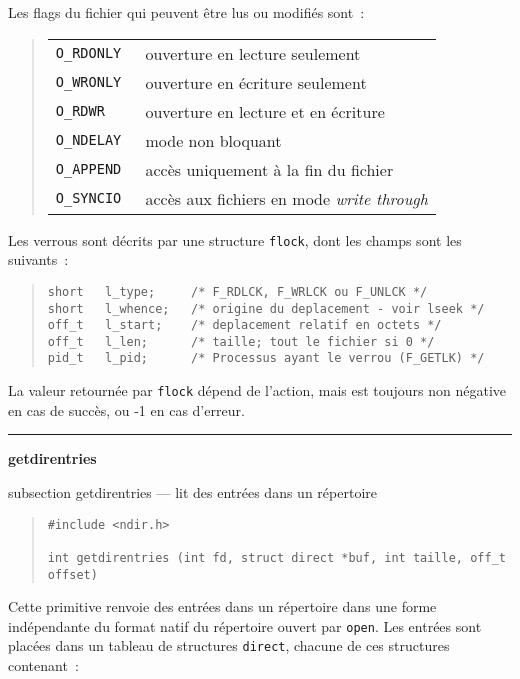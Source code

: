 \documentclass [twoside] {report}
\newcommand {\primitive} [1]
    {
	{\large \bf #1}
	\addcontentsline {toc} {subsection} {#1}
    }
\newcommand {\separation}
    {
	\vspace {7mm}
	\nopagebreak
	\hrule
    }
\begin{document}
Les flags du fichier qui peuvent être lus ou modifiés sont~:

{\small
\begin {quote}
    \begin {tabular} {|ll|} \hline
	\tt O\_RDONLY & ouverture en lecture seulement \\
	\tt O\_WRONLY & ouverture en écriture seulement \\
	\tt O\_RDWR & ouverture en lecture et en écriture \\
	\tt O\_NDELAY & mode non bloquant \\
	\tt O\_APPEND & accès uniquement à la fin du fichier \\
	\tt O\_SYNCIO & accès aux fichiers en mode {\em write through}
	    \\ \hline
    \end {tabular}
\end {quote}
}

Les verrous sont décrits par une structure {\tt flock}, dont les champs
sont les suivants~:

\begin {quote}
\begin {verbatim}
short   l_type;     /* F_RDLCK, F_WRLCK ou F_UNLCK */
short   l_whence;   /* origine du deplacement - voir lseek */
off_t   l_start;    /* deplacement relatif en octets */
off_t   l_len;      /* taille; tout le fichier si 0 */
pid_t   l_pid;      /* Processus ayant le verrou (F_GETLK) */
\end{verbatim}
\end {quote}

La valeur retournée par {\tt flock} dépend de l'action, mais est
toujours non négative en cas de succès, ou
-1 en cas d'erreur.




\separation
\primitive {getdirentries} --- lit des entrées dans un répertoire

\begin {quote}
\begin {verbatim}
#include <ndir.h>

int getdirentries (int fd, struct direct *buf, int taille, off_t offset)
\end{verbatim}
\end {quote}

Cette primitive renvoie des entrées dans un répertoire dans une
forme indépendante du format natif du répertoire ouvert par {\tt open}.
Les entrées sont placées dans un tableau de structures {\tt direct},
chacune de ces structures contenant~:
\end{document}
